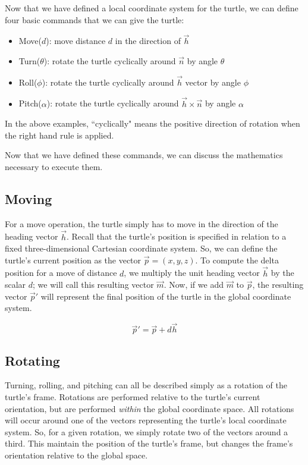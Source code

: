 \documentclass[12pt]{article}
\begin{document}
Now that we have defined a local coordinate system for the turtle, we can define four basic commands that we can give the turtle:

\begin{itemize}
\item Move($d$): move distance $d$ in the direction of $\vec{h}$
\item Turn($\theta$): rotate the turtle cyclically around $\vec{n}$ by angle $\theta$
\item Roll($\phi$): rotate the turtle cyclically around $\vec{h}$ vector by angle $\phi$
\item Pitch($\alpha$): rotate the turtle cyclically around $\vec{h} \times \vec{n}$ by angle  $\alpha$
\end{itemize}

In the above examples, ``cyclically" means the positive direction of rotation when the right hand rule is applied.

Now that we have defined these commands, we can discuss the mathematics necessary to execute them.

\subsection{Moving}

For a move operation, the turtle simply has to move in the direction of the heading vector $\vec{h}$. Recall that the turtle's position is specified in relation to a fixed three-dimensional Cartesian coordinate system. So, we can define the turtle's current position as the vector $\vec{p}=(x,y,z)$. To compute the delta position for a move of distance $d$, we multiply the unit heading vector $\vec{h}$ by the scalar $d$; we will call this resulting vector $\vec{m}$. Now, if we add $\vec{m}$ to $\vec{p}$, the resulting vector $\vec{p}\prime$ will represent the final position of the turtle in the global coordinate system.

\[ \vec{p}\prime = \vec{p} + d  \vec{h} \]

\subsection{Rotating}

Turning, rolling, and pitching can all be described simply as a rotation of the turtle's frame. Rotations are performed relative to the turtle’s current orientation, but are performed \textit{within} the global coordinate space. All rotations will occur around one of the vectors representing the turtle’s local coordinate system. So, for a given rotation, we simply rotate two of the vectors around a third. This maintain the position of the turtle’s frame, but changes the frame’s orientation relative to the global space.
\end{document}
